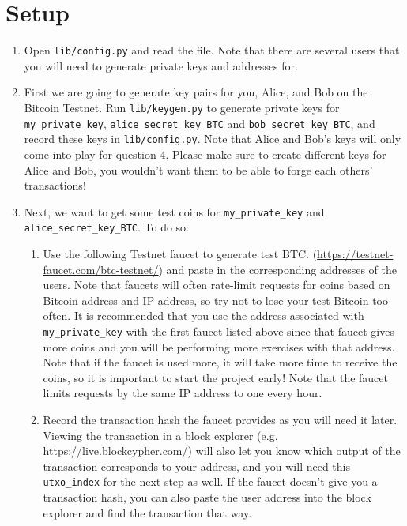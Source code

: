 \documentclass[11pt]{article}
\begin{document}
\section{Setup}
\begin{enumerate}
    \item Open \texttt{lib/config.py} and read the file. Note that there are several users that you will need to generate private keys and addresses for.
    \item First we are going to generate key pairs for you, Alice, and Bob on the Bitcoin Testnet. Run \texttt{lib/keygen.py} to generate private keys for \texttt{my\_private\_key}, \texttt{alice\_secret\_key\_BTC} and \texttt{bob\_secret\_key\_BTC}, and record these keys in \texttt{lib/config.py}. Note that Alice and Bob's keys will only come into play for question 4. Please make sure to create different keys for Alice and Bob, you wouldn't want them to be able to forge each others' transactions!
    \item Next, we want to get some test coins for \texttt{my\_private\_key} and  \texttt{alice\_secret\_key\_BTC}. To do so: \begin{enumerate}
        \item Use the following Testnet faucet to generate test BTC.
        (\href{https://testnet-faucet.com/btc-testnet/}{https://testnet-faucet.com/btc-testnet/}) and paste in the corresponding addresses of the users. 
        Note that faucets will often rate-limit requests for coins based on Bitcoin address and IP address, so try not to lose your test Bitcoin too often. It is recommended that you use the address associated with \texttt{my\_private\_key} with the first faucet listed above since that faucet gives more coins and you will be performing more exercises with that address. Note that if the faucet is used more, it will take more time to receive the coins, so it is important to start the project early! Note that the faucet limits requests by the same IP address to one every hour.
        \item Record the transaction hash the faucet provides as you will need it later. Viewing the transaction in a block explorer (e.g.
        \href{https://live.blockcypher.com/}{https://live.blockcypher.com/}) will also let you know which output of the transaction corresponds to your address, and you will need this \texttt{utxo\_index} for the next step as well. If the faucet doesn't give you a transaction hash, you can also paste the user address into the block explorer and find the transaction that way.
    \end{enumerate}

\end{enumerate}
\end{document}

